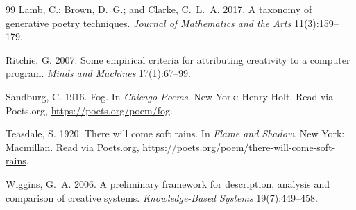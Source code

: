 \documentclass[letterpaper]{article}
\begin{document}
\begin{thebibliography}{99}
Lamb, C.; Brown, D.~G.; and Clarke, C.~L.~A. 2017.
\newblock A taxonomy of generative poetry techniques.
\newblock \emph{Journal of Mathematics and the Arts} 11(3):159--179.

Ritchie, G. 2007.
\newblock Some empirical criteria for attributing creativity to a
computer program.
\newblock \emph{Minds and Machines} 17(1):67--99.

Sandburg, C. 1916.
\newblock Fog.
\newblock In \emph{Chicago Poems}. New York: Henry Holt. Read via
Poets.org, \url{https://poets.org/poem/fog}.

Teasdale, S. 1920.
\newblock There will come soft rains.
\newblock In \emph{Flame and Shadow}. New York: Macmillan. Read via
Poets.org, \url{https://poets.org/poem/there-will-come-soft-rains}.

Wiggins, G.~A. 2006.
\newblock A preliminary framework for description, analysis and
comparison of creative systems.
\newblock \emph{Knowledge-Based Systems} 19(7):449--458.

\end{thebibliography}
\end{document}
